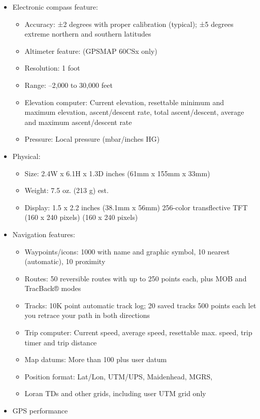 \begin{itemize}
	\item Electronic compass feature:
		\begin{itemize}
			\item Accuracy: ±2 degrees with proper calibration (typical); ±5 degrees extreme northern and southern latitudes 
			\item Altimeter feature: (GPSMAP 60CSx only) 
			\item Resolution: 1 foot 
			\item Range: –2,000 to 30,000 feet 
			\item Elevation computer: Current elevation, resettable minimum and maximum elevation, ascent/descent rate, total ascent/descent, average and maximum ascent/descent rate 
			\item Pressure: Local pressure (mbar/inches HG) 
		\end{itemize}
	\item Physical:
		\begin{itemize}
			\item Size: 2.4W x 6.1H x 1.3D inches (61mm x 155mm x 33mm) 
			\item Weight: 7.5 oz. (213 g) est. 
			\item Display: 1.5 x 2.2 inches (38.1mm x 56mm) 256-color transflective TFT (160 x 240 pixels) (160 x 240 pixels) 
  		\end{itemize}
	\item Navigation features:
		\begin{itemize}
			\item Waypoints/icons: 1000 with name and graphic symbol, 10 nearest (automatic), 10 proximity 
			\item Routes: 50 reversible routes with up to 250 points each, plus MOB and TracBack® modes 
			\item Tracks: 10K point automatic track log; 20 saved tracks 500 points each let you retrace your path in both directions
			\item Trip computer: Current speed, average speed, resettable max. speed, trip timer and trip distance 
			\item Map datums: More than 100 plus user datum 
			\item Position format: Lat/Lon, UTM/UPS, Maidenhead, MGRS, 
			\item Loran TDs and other grids, including user UTM grid only 
		\end{itemize}
	\item GPS performance 
		\begin{itemize}

\end{itemize}
\end{itemize}
